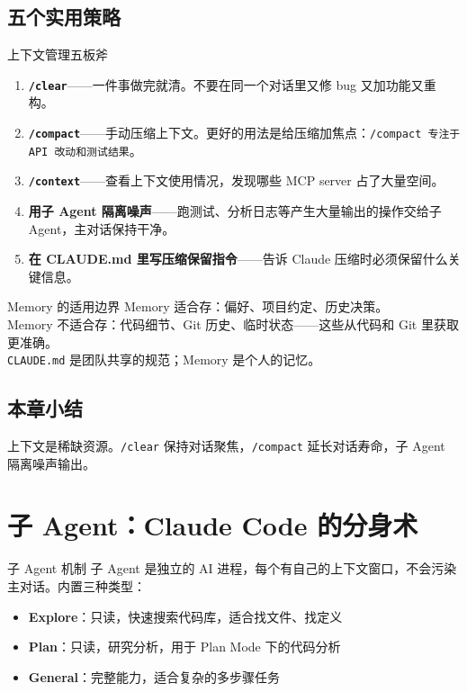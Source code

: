\documentclass[a4paper]{article}
\begin{document}
\subsection{五个实用策略}

\begin{importantbox}{上下文管理五板斧}
\begin{enumerate}[leftmargin=1.5em]
  \item \textbf{\texttt{/clear}}——一件事做完就清。不要在同一个对话里又修 bug 又加功能又重构。
  \item \textbf{\texttt{/compact}}——手动压缩上下文。更好的用法是给压缩加焦点：\texttt{/compact 专注于 API 改动和测试结果}。
  \item \textbf{\texttt{/context}}——查看上下文使用情况，发现哪些 MCP server 占了大量空间。
  \item \textbf{用子 Agent 隔离噪声}——跑测试、分析日志等产生大量输出的操作交给子 Agent，主对话保持干净。
  \item \textbf{在 CLAUDE.md 里写压缩保留指令}——告诉 Claude 压缩时必须保留什么关键信息。
\end{enumerate}
\end{importantbox}

\begin{warningbox}{Memory 的适用边界}
Memory 适合存：偏好、项目约定、历史决策。\\
Memory 不适合存：代码细节、Git 历史、临时状态——这些从代码和 Git 里获取更准确。\\
\texttt{CLAUDE.md} 是团队共享的规范；Memory 是个人的记忆。
\end{warningbox}

\subsection{本章小结}

上下文是稀缺资源。\texttt{/clear} 保持对话聚焦，\texttt{/compact} 延长对话寿命，子 Agent 隔离噪声输出。

\section{子 Agent：Claude Code 的分身术}

\begin{knowledgebox}{子 Agent 机制}
子 Agent 是独立的 AI 进程，每个有自己的上下文窗口，不会污染主对话。内置三种类型：
\begin{itemize}[leftmargin=1.5em]
  \item \textbf{Explore}：只读，快速搜索代码库，适合找文件、找定义
  \item \textbf{Plan}：只读，研究分析，用于 Plan Mode 下的代码分析
  \item \textbf{General}：完整能力，适合复杂的多步骤任务
\end{itemize}
\end{knowledgebox}
\end{document}
